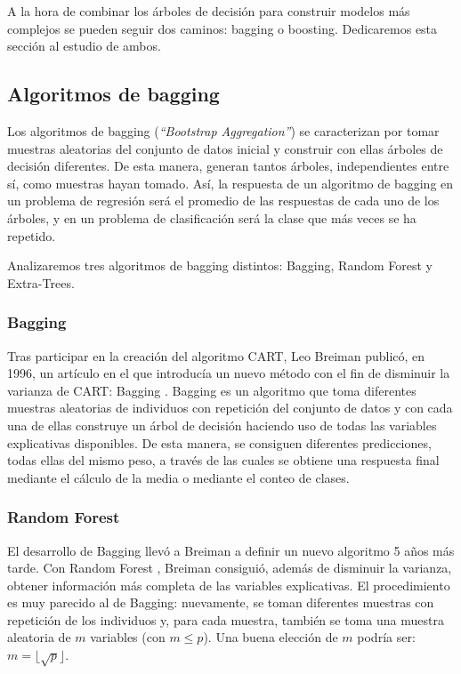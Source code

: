 \documentclass[12pt,twoside]{article}
\begin{document}
A la hora de combinar los árboles de decisión para construir modelos más complejos se pueden seguir dos caminos: bagging o boosting. Dedicaremos esta sección al estudio de ambos.


\subsection{Algoritmos de bagging}
Los algoritmos de bagging (\textit{``Bootstrap Aggregation''}) se caracterizan por tomar muestras aleatorias del conjunto de datos inicial y construir con ellas árboles de decisión diferentes. De esta manera, generan tantos árboles, independientes entre sí, como muestras hayan tomado. Así, la respuesta de un algoritmo de bagging en un problema de regresión será el promedio de las respuestas de cada uno de los árboles, y en un problema de clasificación será la clase que más veces se ha repetido.

Analizaremos tres algoritmos de bagging distintos: Bagging, Random Forest y Extra-Trees.


\subsubsection{Bagging}
Tras participar en la creación del algoritmo CART, Leo Breiman publicó, en 1996, un artículo en el que introducía un nuevo método con el fin de disminuir la varianza de CART: Bagging \cite{BR01}. Bagging es un algoritmo que toma diferentes muestras aleatorias de individuos con repetición del conjunto de datos y con cada una de ellas construye un árbol de decisión haciendo uso de todas las variables explicativas disponibles. De esta manera, se consiguen diferentes predicciones, todas ellas del mismo peso, a través de las cuales se obtiene una respuesta final mediante el cálculo de la media o mediante el conteo de clases.


\subsubsection{Random Forest}
El desarrollo de Bagging llevó a Breiman a definir un nuevo algoritmo 5 años más tarde. Con Random Forest \cite{BR02}, Breiman consiguió, además de disminuir la varianza, obtener información más completa de las variables explicativas. El procedimiento es muy parecido al de Bagging: nuevamente, se toman diferentes muestras con repetición de los individuos y, para cada muestra, también se toma una muestra aleatoria de $m$ variables (con $m \leq p$). Una buena elección de $m$ podría ser: $ m = \lfloor \sqrt{p} \rfloor$.
\end{document}
